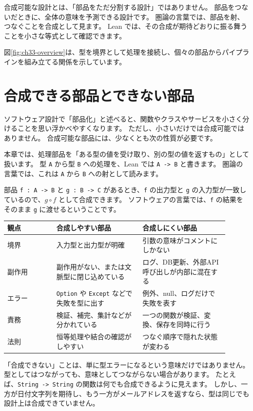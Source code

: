 合成可能な設計とは、「部品をただ分割する設計」ではありません。
部品をつないだときに、全体の意味を予測できる設計です。
圏論の言葉では、部品を射、つなぐことを合成として見ます。
Lean では、その合成が期待どおりに振る舞うことを小さな等式として確認できます。


図\ref{fig:ch33-overview}は、型を境界として処理を接続し、個々の部品からパイプラインを組み立てる関係を示しています。

\section{合成できる部品とできない部品}

ソフトウェア設計で「部品化」と述べると、関数やクラスやサービスを小さく分けることを思い浮かべやすくなります。
ただし、小さいだけでは合成可能ではありません。
合成可能な部品には、少なくとも次の性質が必要です。

本章では、処理部品を「ある型の値を受け取り、別の型の値を返すもの」として扱います。
型 \texttt{A} から型 \texttt{B} への処理を、Lean では \texttt{A -> B} と書きます。
圏論の言葉では、これは \texttt{A} から \texttt{B} への射として読みます。

部品 \texttt{f : A -> B} と \texttt{g : B -> C} があるとき、\texttt{f} の出力型と \texttt{g} の入力型が一致しているので、\(g \circ f\) として合成できます。
ソフトウェアの言葉では、\texttt{f} の結果をそのまま \texttt{g} に渡せるということです。

\begin{longtable}{p{0.20\linewidth}p{0.35\linewidth}p{0.35\linewidth}}
\toprule
観点 & 合成しやすい部品 & 合成しにくい部品 \\
\midrule
境界 & 入力型と出力型が明確 & 引数の意味がコメントにしかない \\
副作用 & 副作用がない、または文脈型に閉じ込めている & ログ、DB更新、外部API呼び出しが内部に混在する \\
エラー & \texttt{Option} や \texttt{Except} などで失敗を型に出す & 例外、null、ログだけで失敗を表す \\
責務 & 検証、補完、集計などが分かれている & 一つの関数が検証、変換、保存を同時に行う \\
法則 & 恒等処理や結合の確認がしやすい & つなぐ順序で隠れた状態が変わる \\
\bottomrule
\end{longtable}

「合成できない」ことは、単に型エラーになるという意味だけではありません。
型としてはつながっても、意味としてつながらない場合があります。
たとえば、\texttt{String -> String} の関数は何でも合成できるように見えます。
しかし、一方が日付文字列を期待し、もう一方がメールアドレスを返すなら、型は同じでも設計上は合成できていません。

